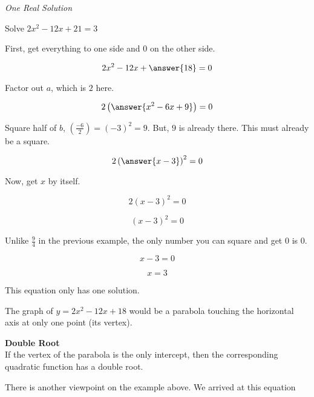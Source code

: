 \documentclass{ximera}
\begin{document}
\begin{example} \textit{One Real Solution}

Solve $2 x^2 - 12x + 21 = 3$ \\

\begin{explanation}


First, get everything to one side and $0$ on the other side.



\[  2 x^2 - 12x + \answer{18} = 0  \]

Factor out $a$, which is $2$ here.

\[  2 \left( \answer{x^2 - 6x + 9} \right) = 0  \]


Square half of $b$, $\left(\frac{-6}{2}\right) = (-3)^2 = 9$.  But, $9$ is already there.  This must already be a square.



\[  2 \left( \answer{x - 3} \right)^2 = 0  \]


Now, get $x$ by itself.

\[  2 (x - 3)^2 = 0  \]

\[  (x - 3)^2 = 0  \]


Unlike $\frac{9}{4}$ in the previous example, the only number you can square and get $0$ is $0$.

\[  x - 3 = 0  \]

\[  x = 3  \]


This equation only has one solution.


\end{explanation}
\end{example}



The graph of $y = 2 x^2 - 12x + 18$ would be a parabola touching the horizontal axis at only one point (its vertex).




\begin{idea} \textbf{\textcolor{red!80!black}{Double Root}} \\

If the vertex of the parabola is the only intercept, then the corresponding quadratic function has a double root.


\end{idea}



There is another viewpoint on the example above.  We arrived at this equation
\end{document}
